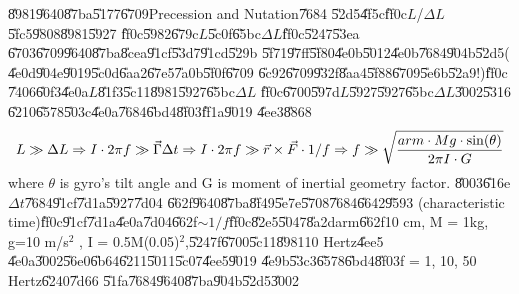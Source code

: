 \begin{case}
\U{8981}\U{9640}\U{87ba}\U{5177}\U{6709}Precession and Nutation\U{7684}%
\U{52d5}\U{4f5c}\U{ff0c}$L$/$\Delta L$\U{5fc5}\U{9808}\U{8981}\U{5927}%
\U{ff0c}\U{5982}\U{679c}$L$\U{5c0f}\U{65bc}$\Delta L$\U{ff0c}\U{5247}\U{53ea}%
\U{6703}\U{6709}\U{9640}\U{87ba}\U{8cea}\U{91cf}\U{53d7}\U{91cd}\U{529b}%
\U{5f71}\U{97ff}\U{5f80}\U{4e0b}\U{5012}\U{4e0b}\U{7684}\U{904b}\U{52d5}(%
\U{4e0d}\U{904e}\U{9019}\U{5c0d}\U{6aa2}\U{67e5}\U{7a0b}\U{5f0f}\U{6709}%
\U{6c92}\U{6709}\U{932f}\U{8aa4}\U{5f88}\U{6709}\U{5e6b}\U{52a9}!)\U{ff0c}%
\U{7406}\U{60f3}\U{4e0a}$L$\U{81f3}\U{5c11}\U{8981}\U{5927}\U{65bc}$\Delta L$%
\U{ff0c}\U{6700}\U{597d}$L$\U{5927}\U{5927}\U{65bc}$\Delta L$\U{3002}\U{5316}%
\U{6210}\U{6578}\U{503c}\U{4e0a}\U{7684}\U{6bd4}\U{8f03}\U{ff1a}\U{9019}%
\U{4ee3}\U{8868}%
\begin{equation*}
L\gg \Delta L\Rightarrow I\cdot 2\pi f\gg \vec{\Gamma}\Delta t\Rightarrow
I\cdot 2\pi f\gg \vec{r}\times \vec{F}\cdot 1/f\Rightarrow f\gg \sqrt{\frac{%
arm\cdot Mg\cdot \sin (\theta )}{2\pi I\cdot G}}
\end{equation*}%
where $\theta $ is gyro's tilt angle and G is moment of inertial geometry
factor. \U{8003}\U{616e}$\Delta t$\U{7684}\U{91cf}\U{7d1a}\U{5927}\U{7d04}%
\U{662f}\U{9640}\U{87ba}\U{8f49}\U{5e7e}\U{5708}\U{7684}\U{6642}\U{9593}%
(characteristic time)\U{ff0c}\U{91cf}\U{7d1a}\U{4e0a}\U{7d04}\U{662f}$\sim
1/f$\U{ff0c}\U{82e5}\U{5047}\U{8a2d}arm\U{662f}10 cm, M = 1kg, g=10 m/s$^{2}$%
, I = 0.5M(0.05)$^{2}$,\U{5247}f\U{6700}\U{5c11}\U{8981}10 Hertz\U{4ee5}%
\U{4e0a}\U{3002}\U{56e0}\U{6b64}\U{6211}\U{5011}\U{5c07}\U{4ee5}\U{9019}%
\U{4e9b}\U{53c3}\U{6578}\U{6bd4}\U{8f03}f = 1, 10, 50 Hertz\U{6240}\U{7d66}%
\U{51fa}\U{7684}\U{9640}\U{87ba}\U{904b}\U{52d5}\U{3002}
\end{case}

%
